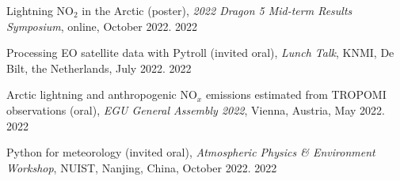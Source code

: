 

\begin{cvpublications}

\publication
{Lightning NO$_2$ in the Arctic (poster),
\emph{2022 Dragon 5 Mid-term Results Symposium},
online, October 2022.} %
{2022} %

\publication
{Processing EO satellite data with Pytroll (invited oral),
\emph{Lunch Talk},
KNMI, De Bilt, the Netherlands, July 2022.} %
{2022} %

\publication
{Arctic lightning and anthropogenic NO$_x$ emissions estimated from TROPOMI observations (oral),
\emph{EGU General Assembly 2022},
Vienna, Austria, May 2022.} %
{2022} %

\publication
{Python for meteorology (invited oral),
\emph{Atmospheric Physics \& Environment Workshop},
NUIST, Nanjing, China, October 2022.} %
{2022} %

\end{cvpublications}
